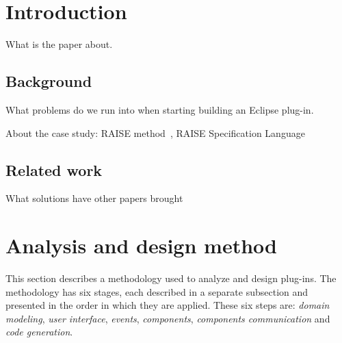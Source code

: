 \documentclass[conference]{IEEEtran}
\begin{document}

%
\IEEEpeerreviewmaketitle


\section{Introduction}
\label{sec:introduction}

What is the paper about.

%
\subsection{Background}
\label{sec:background}

What problems do we run into when starting building an Eclipse plug-in.

About the case study:  RAISE method~\cite{RMG95},
RAISE Specification Language~\cite{RLG92} 
%
\subsection{Related work}
\label{sec:related-work}

What solutions have other papers brought

\section{Analysis and design method}
\label{sec:analys-design-meth}

This section describes a methodology used to analyze and design
plug-ins. The methodology has six stages, each described in a separate
subsection and presented in the order in which they are applied. These
six steps are: \emph{domain modeling}, \emph{user interface},
\emph{events}, \emph{components}, \emph{components communication} and
\emph{code generation}.
\end{document}
